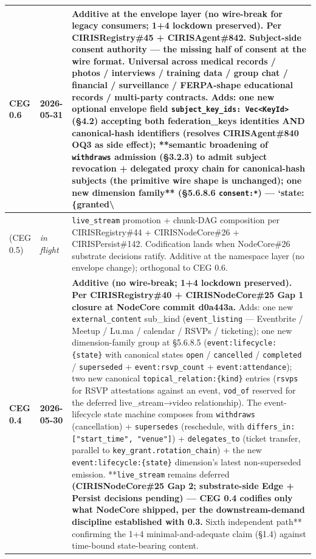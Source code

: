 \documentclass[10pt]{article}
\begin{document}
{\begin{longtable}{|p{5.33cm}|p{5.33cm}|p{5.33cm}|}
\textbf{CEG 0.6} & \textbf{2026-05-31} & \textbf{Additive at the envelope layer (no wire-break for legacy consumers; 1+4 lockdown preserved). Per CIRISRegistry\#45 + CIRISAgent\#842.} Subject-side consent authority — the missing half of consent at the wire format. Universal across medical records / photos / interviews / training data / group chat / financial / surveillance / FERPA-shape educational records / multi-party contracts. Adds: \textbf{one new optional envelope field} \texttt{subject\_key\_ids: Vec<KeyId>} (§4.2) accepting both federation\_keys identities AND canonical-hash identifiers (resolves CIRISAgent\#840 OQ3 as side effect); **semantic broadening of \texttt{withdraws}\textbf{ admission (§3.2.3) to admit subject revocation + delegated proxy chain for canonical-hash subjects (the primitive wire shape is unchanged); }one new dimension family** (§5.6.8.6 \texttt{consent:*}) — `state:\{granted\textbackslash{} \\ \hline
(CEG 0.5) & \textit{in flight} & \texttt{live\_stream} promotion + chunk-DAG composition per CIRISRegistry\#44 + CIRISNodeCore\#26 + CIRISPersist\#142. Codification lands when NodeCore\#26 substrate decisions ratify. Additive at the namespace layer (no envelope change); orthogonal to CEG 0.6. \\ \hline
\textbf{CEG 0.4} & \textbf{2026-05-30} & \textbf{Additive (no wire-break; 1+4 lockdown preserved). Per CIRISRegistry\#40 + CIRISNodeCore\#25 Gap 1 closure at NodeCore commit d0a443a.} Adds: one new \texttt{external\_content} sub\_kind (\texttt{event\_listing} — Eventbrite / Meetup / Lu.ma / calendar / RSVPs / ticketing); one new dimension-family group at §5.6.8.5 (\texttt{event:lifecycle:\{state\}} with canonical states \texttt{open} / \texttt{cancelled} / \texttt{completed} / \texttt{superseded} + \texttt{event:rsvp\_count} + \texttt{event:attendance}); two new canonical \texttt{topical\_relation:\{kind\}} entries (\texttt{rsvps} for RSVP attestations against an event, \texttt{vod\_of} reserved for the deferred live\_stream→video relationship). The event-lifecycle state machine composes from \texttt{withdraws} (cancellation) + \texttt{supersedes} (reschedule, with \texttt{differs\_in: ["start\_time", "venue"]}) + \texttt{delegates\_to} (ticket transfer, parallel to \texttt{key\_grant.rotation\_chain}) + the new \texttt{event:lifecycle:\{state\}} dimension's latest non-superseded emission. **\texttt{live\_stream} remains deferred\textbf{ (CIRISNodeCore\#25 Gap 2; substrate-side Edge + Persist decisions pending) — CEG 0.4 codifies only what NodeCore shipped, per the downstream-demand discipline established with 0.3. }Sixth independent path** confirming the 1+4 minimal-and-adequate claim (§1.4) against time-bound state-bearing content. \\ \hline

\end{longtable}}
\end{document}
